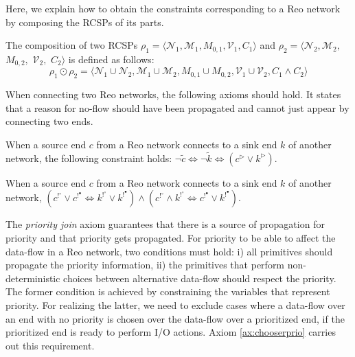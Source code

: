 
Here, we explain how to obtain the constraints corresponding to a Reo network by composing the RCSPs of its parts.
\begin{definition}
\label{def:composition}
The composition of two RCSPs $\rho_1=\langle $$\mathcal{N}_1, $$\mathcal{M}_1,$$ M_{0,1}, \mathcal{V}_1, C_1 \rangle$ and $\rho_2=\langle $$ \mathcal{N}_2, $$\mathcal{M}_2,$ $M_{0,2},$ $\mathcal{V}_2,$ $ C_2 \rangle$ is defined as follows:
$$\rho_1 \odot \rho_2=\langle \mathcal{N}_1 \cup \mathcal{N}_2, \mathcal{M}_1 \cup \mathcal{M}_2, M_{0,1} \cup M_{0,2}, \mathcal{V}_1 \cup \mathcal{V}_2, C_1 \wedge C_2 \rangle$$
\end{definition}

When connecting two Reo networks, the following axioms should hold. %
It states that a reason for no-flow should have been propagated and cannot just appear by connecting two ends. %

\begin{axiom}\label{ax:mixednode}
When a source end $c$ from a Reo network connects to a  sink end $k$ of another network, the following constraint holds:
$ \neg \tilde{c} \Leftrightarrow \neg \tilde{k} \Leftrightarrow  ({c}^\triangleright \vee {k}^\triangleright)$.
\end{axiom}

\begin{axiom}\label{ax:joinprio}
When a source end $c$ from a Reo network connects to a sink end $k$ of another network,
$(c^{!^\circ}\vee c^{!^\bullet} \Leftrightarrow k^{!^\circ}\vee k^{!^\bullet}) \wedge (c^{!^\circ}\wedge k^{!^\circ} \Leftrightarrow c^{!^\bullet}\vee k^{!^\bullet})$.
\end{axiom}

The \emph{priority join} axiom guarantees that there is a source of propagation for priority and that priority gets propagated. %
For priority to be able to affect the data-flow in a Reo network, two conditions must hold: i) all primitives should propagate the priority information, ii) the primitives that perform non-deterministic choices between alternative data-flow should respect the priority.
The former condition is achieved by constraining the variables that represent priority. For realizing the latter, we need to exclude cases where a data-flow over an end with no priority is chosen over the data-flow over a prioritized end, if the prioritized end is ready to perform I/O actions. Axiom \ref{ax:chooserprio} carries out this requirement.

